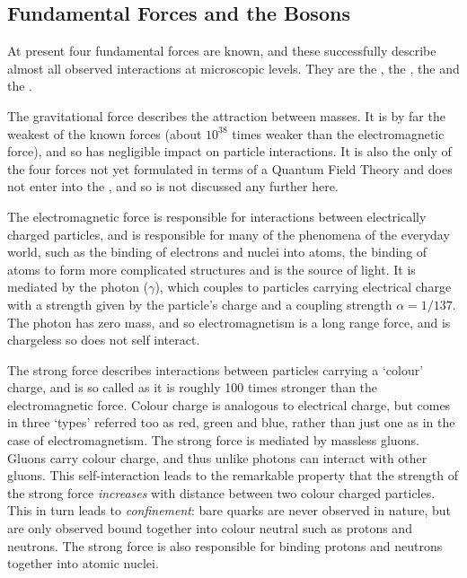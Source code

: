 \subsection{Fundamental Forces and the Bosons}

At present four fundamental forces are known, and these successfully describe
almost all observed interactions at microscopic levels. They are the
, the , the  
and the . 

The gravitational force describes the attraction
between masses. It is by far the
weakest of the known forces (about $10^{38}$ times weaker than the electromagnetic
force), and so has negligible impact on particle interactions. It is
also the only of the four forces not yet formulated in terms of a Quantum Field
Theory and does not enter into the \sm, and so is not discussed any further here.

The electromagnetic force is responsible for interactions between electrically
charged particles, and is responsible for many of the phenomena of the everyday
world, such as the binding of electrons and nuclei into atoms, the binding of
atoms to form more complicated structures and is the source of light. 
It is mediated by the photon ($\gamma$), which couples to
particles carrying electrical charge with a strength given by the particle's
charge and a coupling strength $\alpha=1/137$. The photon has zero
mass, and so electromagnetism is a long range force, and is chargeless so
does not self interact.

The strong force describes interactions between particles carrying a `colour'
charge, and is so called as it is roughly 100 times stronger than the electromagnetic
force. Colour charge is analogous to electrical charge, but comes in three
`types' referred too as red, green and blue, rather than just one as in
the case of electromagnetism. The strong force is mediated by massless gluons. Gluons carry
colour charge, and thus unlike photons can interact with other gluons. This
self-interaction leads to the remarkable property that the strength of the strong force {\it
increases} with distance between two colour charged particles. This in turn leads to {\it
confinement}: bare quarks are never observed in nature, but are only observed
bound together into colour neutral  such as protons and neutrons. 
The strong force is also responsible for binding protons and neutrons together
into atomic nuclei.

